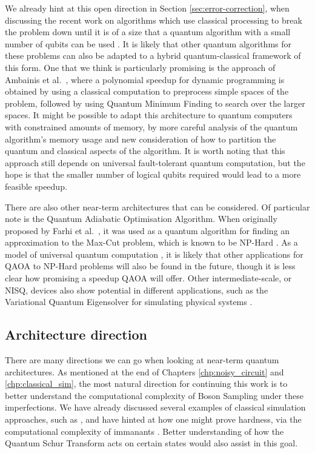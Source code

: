 We already hint at this open direction in Section \ref{sec:error-correction}, when discussing the recent work on algorithms which use classical processing to break the problem down until it is of a size that a quantum algorithm with a small number of qubits can be used \cite{dunjko2018, ge2019}. It is likely that other quantum algorithms for these problems can also be adapted to a hybrid quantum-classical framework of this form. One that we think is particularly promising is the approach of Ambainis et al.~\cite{ambainis2018}, where a polynomial speedup for dynamic programming is obtained by using a classical computation to preprocess simple spaces of the problem, followed by using Quantum Minimum Finding to search over the larger spaces. It might be possible to adapt this architecture to quantum computers with constrained amounts of memory, by more careful analysis of the quantum algorithm's memory usage and new consideration of how to partition the quantum and classical aspects of the algorithm. It is worth noting that this approach still depends on universal fault-tolerant quantum computation, but the hope is that the smaller number of logical qubits required would lead to a more feasible speedup.

There are also other near-term architectures that can be considered. Of particular note is the Quantum Adiabatic Optimisation Algorithm. When originally proposed by Farhi et al.~\cite{farhi2014}, it was used as a quantum algorithm for finding an approximation to the Max-Cut problem, which is known to be NP-Hard \cite{karp1972}. As a model of universal quantum computation \cite{lloyd2018, morales2019}, it is likely that other applications for QAOA to NP-Hard problems will also be found in the future, though it is less clear how promising a speedup QAOA will offer. Other intermediate-scale, or NISQ, devices also show potential in different applications, such as the Variational Quantum Eigensolver for simulating physical systems \cite{peruzzo2014, preskill2018}.

\subsection{Architecture direction}

There are many directions we can go when looking at near-term quantum architectures. As mentioned at the end of Chapters \ref{chp:noisy_circuit} and \ref{chp:classical_sim}, the most natural direction for continuing this work is to better understand the computational complexity of Boson Sampling under these imperfections. We have already discussed several examples of classical simulation approaches, such as \cite{renema2018, renema2018loss, garciapatron2017, oszmaniec2018, brod2019}, and have hinted at how one might prove hardness, via the computational complexity of immanants \cite{hartmann1985, barvinok1990, burgisser2000, burgisser2000immanants, mertens2013}. Better understanding of how the Quantum Schur Transform acts on certain states would also assist in this goal.

